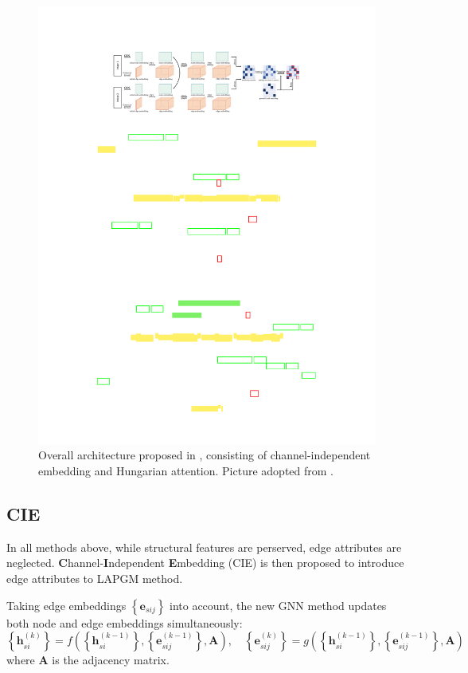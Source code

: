 \documentclass[a4paper]{article}
\newcommand{\set}[1]{\left\{#1\right\}}
\begin{document}
\begin{figure}[htbp]
    \centering
    \includegraphics[width=0.85\linewidth]{Images/cie.pdf}
    \caption{Overall architecture proposed in \cite{cie}, consisting of channel-independent embedding and Hungarian attention. Picture adopted from \cite{cie}.}
\end{figure}
\subsection{CIE}



In all methods above, while structural features are perserved, edge attributes are neglected. \textbf{C}hannel-\textbf{I}ndependent \textbf{E}mbedding (CIE) \cite{cie} is then proposed to introduce edge attributes to LAPGM method. 

Taking edge embeddings $\set{\mathbf{e}_{sij}}$ into account, the new GNN method updates both node and edge embeddings simultaneously:
$$
\set{\mathbf{h}_{si}^{(k)}}  = f\left(\set{\mathbf{h}_{si}^{(k-1)}}, \set{\mathbf{e}_{sij}^{(k-1)}}, \mathbf{A}\right), \quad \set{\mathbf{e}_{sij}^{(k)}}  = g\left(\set{\mathbf{h}_{si}^{(k-1)}}, \set{\mathbf{e}_{sij}^{(k-1)}}, \mathbf{A}\right)
$$
where $\mathbf{A}$ is the adjacency matrix.
\end{document}
